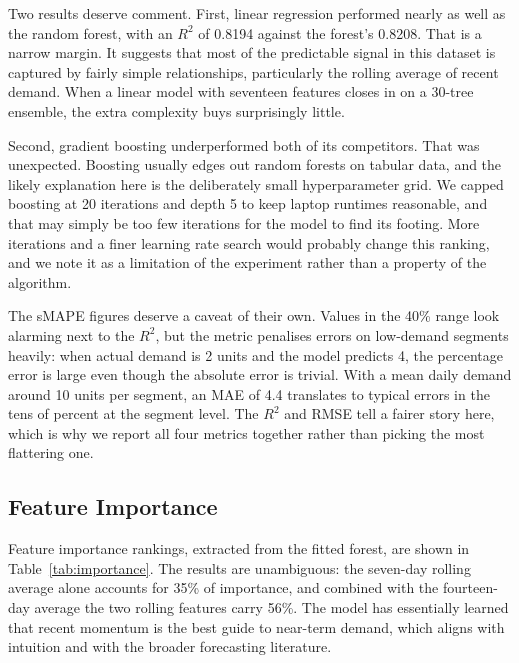 \documentclass[11pt,a4paper]{article}
\begin{document}
Two results deserve comment. First, linear regression performed nearly as well as the random forest, with an $R^2$ of 0.8194 against the forest's 0.8208. That is a narrow margin. It suggests that most of the predictable signal in this dataset is captured by fairly simple relationships, particularly the rolling average of recent demand. When a linear model with seventeen features closes in on a 30-tree ensemble, the extra complexity buys surprisingly little.

Second, gradient boosting underperformed both of its competitors. That was unexpected. Boosting usually edges out random forests on tabular data, and the likely explanation here is the deliberately small hyperparameter grid. We capped boosting at 20 iterations and depth 5 to keep laptop runtimes reasonable, and that may simply be too few iterations for the model to find its footing. More iterations and a finer learning rate search would probably change this ranking, and we note it as a limitation of the experiment rather than a property of the algorithm.

The sMAPE figures deserve a caveat of their own. Values in the 40\% range look alarming next to the $R^2$, but the metric penalises errors on low-demand segments heavily: when actual demand is 2 units and the model predicts 4, the percentage error is large even though the absolute error is trivial. With a mean daily demand around 10 units per segment, an MAE of 4.4 translates to typical errors in the tens of percent at the segment level. The $R^2$ and RMSE tell a fairer story here, which is why we report all four metrics together rather than picking the most flattering one.

\subsection{Feature Importance}

Feature importance rankings, extracted from the fitted forest, are shown in Table~\ref{tab:importance}. The results are unambiguous: the seven-day rolling average alone accounts for 35\% of importance, and combined with the fourteen-day average the two rolling features carry 56\%. The model has essentially learned that recent momentum is the best guide to near-term demand, which aligns with intuition and with the broader forecasting literature.
\end{document}
